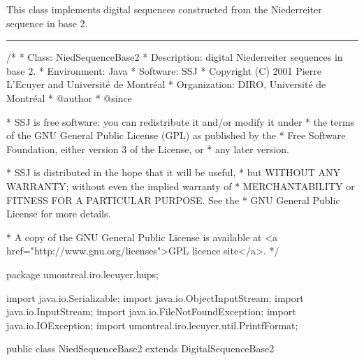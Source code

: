 
This class implements digital sequences constructed from the
Niederreiter sequence in base 2.


\bigskip\hrule
\begin{code}
\begin{hide}
/*
 * Class:        NiedSequenceBase2
 * Description:  digital Niederreiter sequences in base 2.
 * Environment:  Java
 * Software:     SSJ 
 * Copyright (C) 2001  Pierre L'Ecuyer and Université de Montréal
 * Organization: DIRO, Université de Montréal
 * @author       
 * @since

 * SSJ is free software: you can redistribute it and/or modify it under
 * the terms of the GNU General Public License (GPL) as published by the
 * Free Software Foundation, either version 3 of the License, or
 * any later version.

 * SSJ is distributed in the hope that it will be useful,
 * but WITHOUT ANY WARRANTY; without even the implied warranty of
 * MERCHANTABILITY or FITNESS FOR A PARTICULAR PURPOSE.  See the
 * GNU General Public License for more details.

 * A copy of the GNU General Public License is available at
   <a href="http://www.gnu.org/licenses">GPL licence site</a>.
 */
\end{hide}
package umontreal.iro.lecuyer.hups;\begin{hide}

import java.io.Serializable;
import java.io.ObjectInputStream;
import java.io.InputStream;
import java.io.FileNotFoundException;
import java.io.IOException;
import umontreal.iro.lecuyer.util.PrintfFormat;
\end{hide}

public class NiedSequenceBase2 extends DigitalSequenceBase2\begin{hide} { 

   private static final int MAXDIM = 318;  // Maximum dimension.
   private static final int NUMCOLS = 30;  // Maximum number of columns.
\end{hide} 
\end{code}
